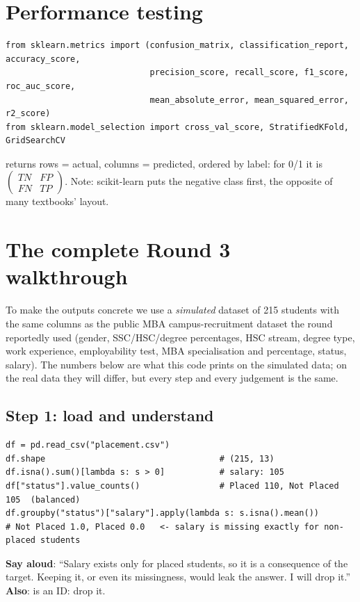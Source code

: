 \section{Performance testing}
\begin{lstlisting}
from sklearn.metrics import (confusion_matrix, classification_report, accuracy_score,
                             precision_score, recall_score, f1_score, roc_auc_score,
                             mean_absolute_error, mean_squared_error, r2_score)
from sklearn.model_selection import cross_val_score, StratifiedKFold, GridSearchCV
\end{lstlisting}
 returns rows = actual, columns = predicted, ordered by label: for 0/1 it is $\begin{pmatrix}TN & FP\\FN & TP\end{pmatrix}$.
Note: scikit-learn puts the negative class first, the opposite of many textbooks' layout.

\section{The complete Round 3 walkthrough}
To make the outputs concrete we use a \emph{simulated} dataset of 215 students with the same columns as the public MBA campus-recruitment dataset the round reportedly used
(gender, SSC/HSC/degree percentages, HSC stream, degree type, work experience, employability test, MBA specialisation and percentage, status, salary). The numbers below are what this
code prints on the simulated data; on the real data they will differ, but every step and every judgement is the same.

\subsection{Step 1: load and understand}
\begin{lstlisting}
df = pd.read_csv("placement.csv")
df.shape                                   # (215, 13)
df.isna().sum()[lambda s: s > 0]           # salary: 105
df["status"].value_counts()                # Placed 110, Not Placed 105  (balanced)
df.groupby("status")["salary"].apply(lambda s: s.isna().mean())
# Not Placed 1.0, Placed 0.0   <- salary is missing exactly for non-placed students
\end{lstlisting}
\textbf{Say aloud}: ``Salary exists only for placed students, so it is a consequence of the target. Keeping it, or even its missingness, would leak the answer. I will drop it.''
\textbf{Also}:  is an ID: drop it.

